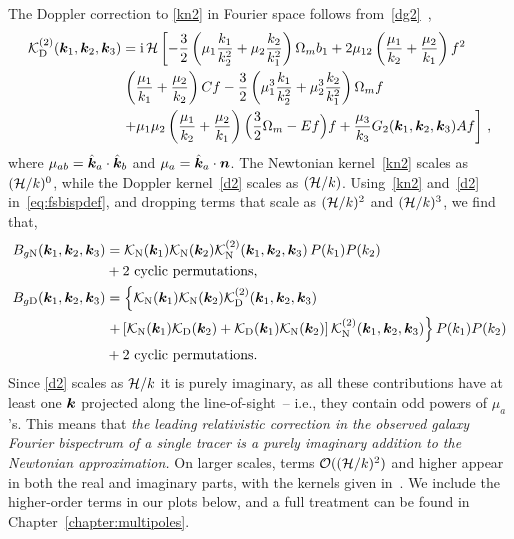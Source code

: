 The Doppler correction to \eqref{kn2} in Fourier space follows from~\eqref{dg2}~\citep{Jolicoeur:2017eyi},
\begin{align}
\mathcal{K}^{(2)}_{\mathrm{D}}(\bm {k}_1,\bm {k}_2,\bm {k}_3) &= \mathrm{i\,} \mathcal{H}
\left[ - \frac{3}{2} \left( \mu_{1} \frac{k_{1}}{k_2^2} + \mu_{2} \frac{k_{2}}{k_1^2} \right) \Omega_m b_1 + 2\mu_{12} \left( \frac{\mu_{1}}{k_2} + \frac{\mu_{2}}{k_1}\right) f^2  \right. \nonumber \\
& \left. \left( \frac{\mu_{1}}{k_1} + \frac{\mu_{2}}{k_2} \right){C} f - \frac{3}{2} \left( \mu_{1}^3 \frac{k_{1}}{k_2^2} + \mu_{2}^3 \frac{k_{2}}{k_1^2} \right)\Omega_m f \nonumber\right.  \\
&\left. + \mu_{1}\mu_{2}\left( \frac{\mu_{1}}{k_2} + \frac{\mu_{2}}{k_1} \right) {\Big( \frac{3}{2} \Omega_m - E f\Big) f} + \frac{\mu_{3}}{k_{3}} G_{2}(\bm{k}_{1}, \bm{k}_{2},\bm {k}_3){A} f\right]\,, \label{d2}
\end{align}
where $\mu_{ab}=\hat{\bm {k}}_a\cdot \hat{\bm {k}}_b$ and $\mu_a=\hat{\bm {k}}_a\cdot\bm n$. 
The Newtonian kernel~\eqref{kn2} scales as $(\mathcal{H}/k)^{0}$, while the Doppler kernel~\eqref{d2} scales as $(\mathcal{H}/k)$. 
Using~\eqref{kn2} and~\eqref{d2} in~\eqref{eq:fsbispdef}, and dropping terms that scale as $(\mathcal{H}/k)^{2}$ and $(\mathcal{H}/k)^{3}$,
we find that,
\begin{align}
B_{g{\mathrm{N}}}(\bm {k}_1,\bm {k}_2,\bm {k}_3) &=  \mathcal{K}_{\mathrm{N}}(\bm {k}_1)\mathcal{K}_{\mathrm{N}}(\bm {k}_2)\mathcal{K}^{(2)}_{\mathrm{N}}(\bm {k}_1,\bm {k}_2,\bm {k}_3)\,P(k_{1})P(k_{2})  \nonumber \\
& +\text{2 cyclic permutations,} \\
B_{g{\mathrm{D}}}(\bm {k}_1,\bm {k}_2,\bm {k}_3) &= \left\{
\mathcal{K}_{\mathrm{N}}(\bm {k}_1)\mathcal{K}_{\mathrm{N}}(\bm {k}_2)\mathcal{K}^{(2)}_{\mathrm{D}}(\bm {k}_1,\bm {k}_2,\bm {k}_3) \right.
\nonumber\\ \label{bd}
& \left. +\left[ \mathcal{K}_{\mathrm{N}}(\bm {k}_1)\mathcal{K}_{\mathrm{D}}(\bm {k}_2)+\mathcal{K}_{\mathrm{D}}(\bm {k}_1)\mathcal{K}_{\mathrm{N}}(\bm {k}_2) \right]\mathcal{K}^{(2)}_{\mathrm{N}}(\bm {k}_1,\bm {k}_2,\bm {k}_3)
\right\}
P(k_{1})P(k_{2}) \nonumber \\
& +\text{2 cyclic permutations.}
\end{align}
Since \eqref{d2} scales as $\mathcal{H}/k$ it is purely imaginary, as all these contributions have at least one $\bm {k}$ projected along the line-of-sight~-- i.e.,  they contain odd powers of $\mu_a$'s. This means that {\em the leading relativistic correction in the observed galaxy Fourier bispectrum of a single tracer is a purely imaginary addition to the Newtonian approximation.} On larger scales, terms $\mathcal{O}((\mathcal{H}/k)^{2})$ and higher appear in both the real and imaginary parts, with the kernels given in~\cite{Umeh:2016nuh,Jolicoeur:2017nyt,Jolicoeur:2017eyi,Jolicoeur:2018blf}. We include the higher-order terms in our plots below, and a full treatment can be found in Chapter~\ref{chapter:multipoles}.

